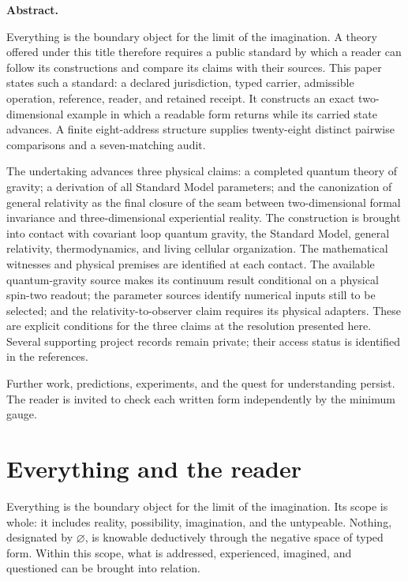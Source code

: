 \noindent\textbf{Abstract.}

Everything is the boundary object for the limit of the imagination. A theory offered under this title therefore requires a public standard by which a reader can follow its constructions and compare its claims with their sources. This paper states such a standard: a declared jurisdiction, typed carrier, admissible operation, reference, reader, and retained receipt. It constructs an exact two-dimensional example in which a readable form returns while its carried state advances. A finite eight-address structure supplies twenty-eight distinct pairwise comparisons and a seven-matching audit.

The undertaking advances three physical claims: a completed quantum theory of gravity; a derivation of all Standard Model parameters; and the canonization of general relativity as the final closure of the seam between two-dimensional formal invariance and three-dimensional experiential reality. The construction is brought into contact with covariant loop quantum gravity, the Standard Model, general relativity, thermodynamics, and living cellular organization. The mathematical witnesses and physical premises are identified at each contact. The available quantum-gravity source makes its continuum result conditional on a physical spin-two readout; the parameter sources identify numerical inputs still to be selected; and the relativity-to-observer claim requires its physical adapters. These are explicit conditions for the three claims at the resolution presented here. Several supporting project records remain private; their access status is identified in the references.

Further work, predictions, experiments, and the quest for understanding persist. The reader is invited to check each written form independently by the minimum gauge.

\hypertarget{everything-and-the-reader}{%
\section{Everything and the reader}\label{everything-and-the-reader}}

Everything is the boundary object for the limit of the imagination. Its scope is whole: it includes reality, possibility, imagination, and the untypeable. Nothing, designated by \(\varnothing\), is knowable deductively through the negative space of typed form. Within this scope, what is addressed, experienced, imagined, and questioned can be brought into relation.


